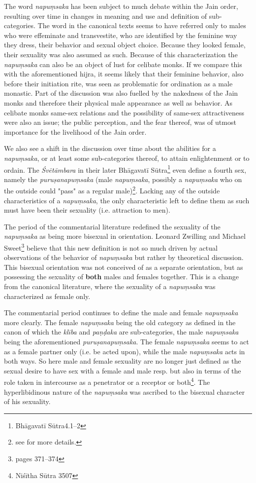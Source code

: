 The word {\em napuṃsaka} has been subject to much debate within the Jain order, resulting over time in changes in meaning and use and definition of sub-categories. The word in the canonical texts seems to have referred only to males who were effeminate and transvestite, who are identified by the feminine way they dress, their behavior and sexual object choice. Because they looked female, their sexuality was also assumed as such. Because of this characterization the {\em napuṃsaka} can also be an object of lust for celibate monks. If we compare this with the aforementioned hijra, it seems likely that their feminine behavior, also before their initiation rite, was seen as problematic for ordination as a male monastic. Part of the discussion was also fuelled by the nakedness of the Jain monks and therefore their physical male appearance as well as behavior. As celibate monks same-sex relations and the possibility of same-sex attractiveness were also an issue; the public perception, and the fear thereof, was of utmost importance for the livelihood of the Jain order. 

We also see a shift in the discussion over time about the abilities for a {\em napuṃsaka}, or at least some sub-categories thereof, to attain enlightenment or to ordain. The {\em Śvētāmbara} in their later Bhāgavatī Sūtra\footnote{Bhāgavatī Sūtra4.1–2} even define a fourth sex, namely the {\em puruṣanapuṃsaka} (male {\em napuṃsaka}, possibly a {\em napuṃsaka} who on the outside could "pass" as a regular male)\footnote{see \cite{zwilling} for more details.}. Lacking any of the outside characteristics of a {\em napuṃsaka}, the only characteristic left to define them as such must have been their sexuality (i.e. attraction to men).

The period of the commentarial literature redefined the sexuality of the {\em napuṃsaka} as being more bisexual in orientation. Leonard Zwilling and Michael Sweet\footnote{\cite{zwilling} pages 371–374} believe that this new definition is not so much driven by actual observations of the behavior of {\em napuṃsaka} but rather by theoretical discussion. This bisexual orientation was not conceived of as a separate orientation, but as possessing the sexuality of \textbf{both} males and females together. This is a change from the canonical literature, where the sexuality of a {\em napuṃsaka} was characterized as female only.

The commentarial period continues to define the male and female {\em napuṃsaka} more clearly. The female {\em napuṃsaka} being the old category as defined in the canon of which the {\em klība} and {\em paṇḍaka} are sub-categories, the male {\em napuṃsaka} being the aforementioned {\em puruṣanapuṃsaka}. The female {\em napuṃsaka} seems to act as a female partner only (i.e. be acted upon), while the male {\em napuṃsaka} acts in both ways. So here male and female sexuality are no longer just defined as the sexual desire to have sex with a female and male resp. but also in terms of the role taken in intercourse as a penetrator or a receptor or both\footnote{Niśītha Sūtra 3507}. The hyperlibidinous nature of the {\em napuṃsaka} was ascribed to the bisexual character of his sexuality.

